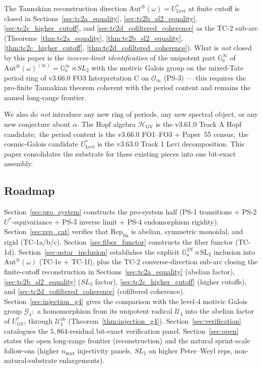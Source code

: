 \documentclass[11pt,a4paper]{article}
\theoremstyle{plain}
\theoremstyle{definition}
\newcommand{\nmax}{n_{\max}}
\newcommand{\HGV}{\mathcal{H}_{\mathrm{GV}}}
\newcommand{\Ginf}{\mathcal{O}_{\infty}}
\newcommand{\Repcat}{\mathrm{Rep}_{\mathrm{fin}}}
\newcommand{\Aut}{\mathrm{Aut}}
\newcommand{\SL}{\mathrm{SL}}
\newcommand{\Ga}{\mathbb{G}_{a}}
\newcommand{\Ulev}{U^{*}_{\mathrm{Levi}}}
\newcommand{\Ustar}{U^{*}}
\newcommand{\fibfun}{\omega}
\begin{document}
The Tannakian reconstruction direction $\Aut^{\otimes}(\fibfun) =
\Ulev$ at finite cutoff is closed in Sections~\ref{sec:tc2a_equality},
\ref{sec:tc2b_sl2_equality}, \ref{sec:tc2c_higher_cutoff}, and
\ref{sec:tc2d_cofiltered_coherence} as the TC-2 sub-arc
(Theorems~\ref{thm:tc2a_equality}, \ref{thm:tc2b_sl2_equality},
\ref{thm:tc2c_higher_cutoff}, \ref{thm:tc2d_cofiltered_coherence}).
What is \emph{not} closed by this paper is the \emph{inverse-limit
identification} of the unipotent part $\Ga^{\infty}$ of
$\Aut^{\otimes}(\fibfun)^{(\infty)} = \Ga^{\infty} \rtimes SL_{2}$ with
the motivic Galois group on the mixed-Tate
period ring of v3.66.0 FO3 Interpretation C on $\Ginf$ (PS-3) ---
this requires the pro-finite Tannakian theorem
\cite{deligne1990,brown2012} coherent with the period content and
remains the named long-range frontier.

We also do \emph{not} introduce any new ring of periods, any new
spectral object, or any new conjecture about $\alpha$. The Hopf
algebra $\HGV$ is the v3.61.0 Track A Hopf candidate;\ the period
content is the v3.66.0 FO1--FO3 + Paper~55 census;\ the
cosmic-Galois candidate $\Ulev$ is the v3.63.0 Track 1 Levi
decomposition. This paper consolidates the substrate for these
existing pieces into one bit-exact assembly.

\subsection{Roadmap}\label{sec:roadmap}

Section~\ref{sec:pro_system} constructs the pro-system half (PS-1
transitions + PS-2 $\Ustar$-equivariance + PS-3 inverse limit + PS-4
endomorphism rigidity). Section~\ref{sec:rep_cat} verifies that
$\Repcat$ is abelian, symmetric monoidal, and rigid (TC-1a/b/c).
Section~\ref{sec:fiber_functor} constructs the fiber functor (TC-1d).
Section~\ref{sec:ustar_inclusion} establishes the explicit $\Ga^{3N}
\rtimes \SL_{2}$ inclusion into $\Aut^{\otimes}(\fibfun)$ (TC-1e +
TC-1f), plus the TC-2 converse-direction sub-arc closing the
finite-cutoff reconstruction in Sections~\ref{sec:tc2a_equality}
(abelian factor), \ref{sec:tc2b_sl2_equality} ($SL_{2}$ factor),
\ref{sec:tc2c_higher_cutoff} (higher cutoffs), and
\ref{sec:tc2d_cofiltered_coherence} (cofiltered coherence).
Section~\ref{sec:injection_g4} gives the comparison with the level-4
motivic Galois group $\mathcal{G}_{4}$:\ a homomorphism from its unipotent
radical $\mathcal{U}_{4}$ into the abelian factor of $\Ustar_{GV}$, through
$\mathcal{U}_{4}^{\mathrm{ab}}$ (Theorem~\ref{thm:injection_g4}).
Section~\ref{sec:verification} catalogues the
$5{,}864$-residual bit-exact verification panel.
Section~\ref{sec:open} states the open long-range frontier
(reconstruction) and the natural sprint-scale follow-ons (higher
$\nmax$ injectivity panels, $SL_{2}$ on higher Peter--Weyl reps,
non-natural-substrate enlargements).
\end{document}
